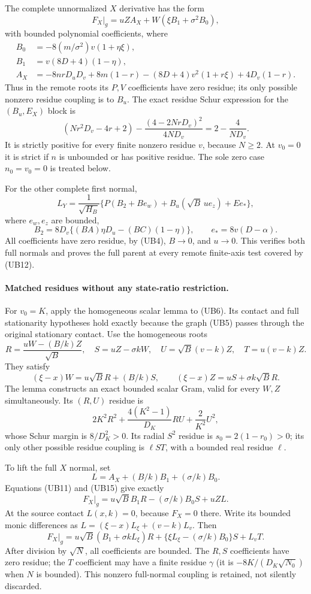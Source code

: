The complete unnormalized $X$ derivative has the form
\[
 F_X|_g=uZ A_X+W(\xi B_1+\sigma^2 B_0),             \tag{UB11}
\]
with bounded polynomial coefficients, where
\begin{align*}
 B_0&=-8(m/\sigma^2)v(1+\eta\xi),\\
 B_1&=v(8D+4)(1-\eta),\\
 A_X&=-8nrD_uD_v+8m(1-r)
       -(8D+4)v^2(1+r\xi)+4D_v(1-r).
\end{align*}
Thus in the remote roots its $P,V$ coefficients have zero residue;
its only possible nonzero residue coupling is to $B_u$.
The exact residue Schur expression for the $(B_u,E_X)$ block is
\[
 (N r^2D_v-4r+2)
       -\frac{(4-2NrD_v)^2}{4ND_v}
                 =2-\frac4{ND_v}.                  \tag{UB12}
\]
It is strictly positive for every finite nonzero residue $v$,
because $N\geq2$.  At $v_0=0$ it is strict if $n$ is unbounded
or has positive residue.  The sole zero case $n_0=v_0=0$ is
treated below.

For the other complete first normal,
\[
 L_Y=\frac1{\sqrt{H_B}}
 \{P(B_2+B e_w)+B_u(\sqrt B\,u e_z)+E e_*\},       \tag{UB13}
\]
where $e_w,e_z$ are bounded,
\[
 B_2=8D_v\{(BA)\eta D_u-(BC)(1-\eta)\},\qquad
 e_*=8v(D-\alpha).
\]
All coefficients have zero residue, by (UB4), $B\to0$, and
$u\to0$.  This verifies both full normals and proves the full
parent at every remote finite-axis test covered by (UB12).

\paragraph{Matched residues without any state-ratio restriction.}
For $v_0=K$, apply the homogeneous scalar lemma to (UB6).  Its
contact and full stationarity hypotheses hold exactly because the
graph (UB5) passes through the original stationary contact.
Use the homogeneous roots
\[
 R=\frac{uW-(B/k)Z}{\sqrt B},\quad
 S=uZ-\sigma kW,\quad
 U=\sqrt B(v-k)Z,\quad T=u(v-k)Z.                  \tag{UB14}
\]
They satisfy
\[
 (\xi-x)W=u\sqrt B R+(B/k)S,\qquad
 (\xi-x)Z=uS+\sigma k\sqrt B R.                    \tag{UB15}
\]
The lemma constructs an exact bounded scalar Gram, valid for
every $W,Z$ simultaneously.  Its $(R,U)$ residue is
\[
 2K^2R^2+\frac{4(K^2-1)}{D_K}RU+\frac2{K^2}U^2,
\]
whose Schur margin is $8/D_K^2>0$.  Its radial $S^2$ residue is
$s_0=2(1-r_0)>0$; its only other possible residue coupling is
$\ell ST$, with a bounded real residue $\ell$.

To lift the full $X$ normal, set
\[
 L=A_X+(B/k)B_1+(\sigma/k)B_0.
\]
Equations (UB11) and (UB15) give exactly
\[
 F_X|_g=u\sqrt B B_1R-(\sigma/k)B_0S+uZL.
\]
At the source contact $L(x,k)=0$, because $F_X=0$ there.
Write its bounded monic differences as
$L=(\xi-x)L_\xi+(v-k)L_v$.  Then
\[
 F_X|_g=
 u\sqrt B(B_1+\sigma kL_\xi)R
 +\{\xi L_\xi-(\sigma/k)B_0\}S+L_vT.             \tag{UB16}
\]
After division by $\sqrt N$, all coefficients are bounded.
The $R,S$ coefficients have zero residue; the $T$ coefficient
may have a finite residue $\gamma$ (it is
$-8K/(D_K\sqrt{N_0})$ when $N$ is bounded).
This nonzero full-normal coupling is retained, not silently
discarded.

